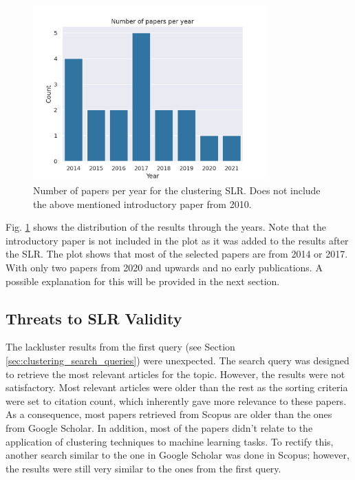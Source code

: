 \begin{figure}
    \centering
    \includegraphics[width=0.8\textwidth]{figures/clustering_papers_per_year.png}
    \caption{Number of papers per year for the clustering SLR. Does not include the above mentioned introductory paper from 2010.}
    \label{fig:cluster_papers_year}
\end{figure}

Fig. \ref{fig:cluster_papers_year} shows the distribution of the results through the years. Note that the introductory paper \cite{Jain_Dataclustering50_2010} is not included in the plot as it was added to the results after the SLR. The plot shows that most of the selected papers are from 2014 or 2017. With only two papers from 2020 and upwards and no early publications. A possible explanation for this will be provided in the next section.

\subsection{Threats to SLR Validity}\label{sec:sota_clustering_threats}
The lackluster results from the first query (see Section \ref{sec:clustering_search_queries}) were unexpected. The search query was designed to retrieve the most relevant articles for the topic. However, the results were not satisfactory. Most relevant articles were older than the rest as the sorting criteria were set to citation count, which inherently gave more relevance to these papers. As a consequence, most papers retrieved from Scopus are older than the ones from Google Scholar. In addition, most of the papers didn't relate to the application of clustering techniques to machine learning tasks. To rectify this, another search similar to the one in Google Scholar was done in Scopus; however, the results were still very similar to the ones from the first query.

